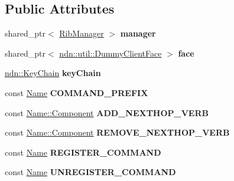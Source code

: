 \subsection*{Public Attributes}
\begin{DoxyCompactItemize}
\item 
shared\+\_\+ptr$<$ \hyperlink{classnfd_1_1rib_1_1RibManager}{Rib\+Manager} $>$ {\bfseries manager}\hypertarget{classnfd_1_1rib_1_1tests_1_1RibManagerFixture_aa01babd089dfb3c08d7cc7011df48f7a}{}\label{classnfd_1_1rib_1_1tests_1_1RibManagerFixture_aa01babd089dfb3c08d7cc7011df48f7a}

\item 
shared\+\_\+ptr$<$ \hyperlink{classndn_1_1util_1_1DummyClientFace}{ndn\+::util\+::\+Dummy\+Client\+Face} $>$ {\bfseries face}\hypertarget{classnfd_1_1rib_1_1tests_1_1RibManagerFixture_a520a6856802d8de09753c65472b886a9}{}\label{classnfd_1_1rib_1_1tests_1_1RibManagerFixture_a520a6856802d8de09753c65472b886a9}

\item 
\hyperlink{classndn_1_1security_1_1KeyChain}{ndn\+::\+Key\+Chain} {\bfseries key\+Chain}\hypertarget{classnfd_1_1rib_1_1tests_1_1RibManagerFixture_a4b3e2283a265990cac5878f1c6f3f333}{}\label{classnfd_1_1rib_1_1tests_1_1RibManagerFixture_a4b3e2283a265990cac5878f1c6f3f333}

\item 
const \hyperlink{classndn_1_1Name}{Name} {\bfseries C\+O\+M\+M\+A\+N\+D\+\_\+\+P\+R\+E\+F\+IX}\hypertarget{classnfd_1_1rib_1_1tests_1_1RibManagerFixture_aaca1d8b96cdd9e5f7a9d524eda1682e5}{}\label{classnfd_1_1rib_1_1tests_1_1RibManagerFixture_aaca1d8b96cdd9e5f7a9d524eda1682e5}

\item 
const \hyperlink{classndn_1_1name_1_1Component}{Name\+::\+Component} {\bfseries A\+D\+D\+\_\+\+N\+E\+X\+T\+H\+O\+P\+\_\+\+V\+E\+RB}\hypertarget{classnfd_1_1rib_1_1tests_1_1RibManagerFixture_a6329af18e1c7207fb68ea3230f9a47d9}{}\label{classnfd_1_1rib_1_1tests_1_1RibManagerFixture_a6329af18e1c7207fb68ea3230f9a47d9}

\item 
const \hyperlink{classndn_1_1name_1_1Component}{Name\+::\+Component} {\bfseries R\+E\+M\+O\+V\+E\+\_\+\+N\+E\+X\+T\+H\+O\+P\+\_\+\+V\+E\+RB}\hypertarget{classnfd_1_1rib_1_1tests_1_1RibManagerFixture_ad1633d280810cc1d7df910cd4d3b5a6c}{}\label{classnfd_1_1rib_1_1tests_1_1RibManagerFixture_ad1633d280810cc1d7df910cd4d3b5a6c}

\item 
const \hyperlink{classndn_1_1Name}{Name} {\bfseries R\+E\+G\+I\+S\+T\+E\+R\+\_\+\+C\+O\+M\+M\+A\+ND}\hypertarget{classnfd_1_1rib_1_1tests_1_1RibManagerFixture_a2c680ea1fd1a1f8ac0f25048f7595893}{}\label{classnfd_1_1rib_1_1tests_1_1RibManagerFixture_a2c680ea1fd1a1f8ac0f25048f7595893}

\item 
const \hyperlink{classndn_1_1Name}{Name} {\bfseries U\+N\+R\+E\+G\+I\+S\+T\+E\+R\+\_\+\+C\+O\+M\+M\+A\+ND}\hypertarget{classnfd_1_1rib_1_1tests_1_1RibManagerFixture_aeed3d952597c100f567d778b97e11fe0}{}\label{classnfd_1_1rib_1_1tests_1_1RibManagerFixture_aeed3d952597c100f567d778b97e11fe0}

\end{DoxyCompactItemize}
